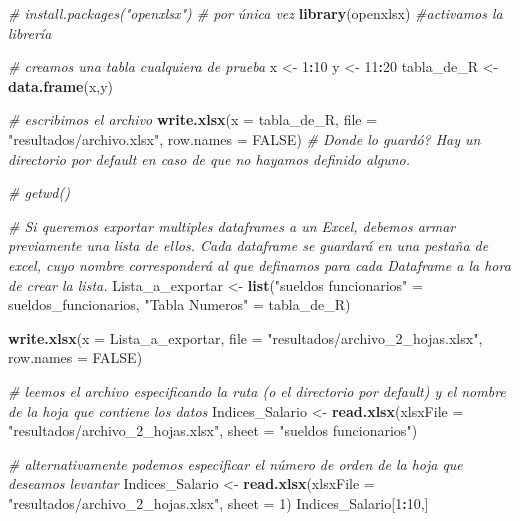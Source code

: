 \documentclass[]{book}
\newenvironment{Shaded}{\begin{snugshade}}{\end{snugshade}}
\newcommand{\CommentTok}[1]{\textcolor[rgb]{0.56,0.35,0.01}{\textit{#1}}}
\newcommand{\DataTypeTok}[1]{\textcolor[rgb]{0.13,0.29,0.53}{#1}}
\newcommand{\DecValTok}[1]{\textcolor[rgb]{0.00,0.00,0.81}{#1}}
\newcommand{\KeywordTok}[1]{\textcolor[rgb]{0.13,0.29,0.53}{\textbf{#1}}}
\newcommand{\NormalTok}[1]{#1}
\newcommand{\OperatorTok}[1]{\textcolor[rgb]{0.81,0.36,0.00}{\textbf{#1}}}
\newcommand{\OtherTok}[1]{\textcolor[rgb]{0.56,0.35,0.01}{#1}}
\newcommand{\StringTok}[1]{\textcolor[rgb]{0.31,0.60,0.02}{#1}}
\begin{document}
\begin{Shaded}
\begin{Highlighting}[]
\CommentTok{# install.packages("openxlsx") # por única vez}
\KeywordTok{library}\NormalTok{(openxlsx) }\CommentTok{#activamos la librería}

\CommentTok{# creamos una tabla cualquiera de prueba}
\NormalTok{x <-}\StringTok{ }\DecValTok{1}\OperatorTok{:}\DecValTok{10}
\NormalTok{y <-}\StringTok{ }\DecValTok{11}\OperatorTok{:}\DecValTok{20}
\NormalTok{tabla_de_R <-}\StringTok{ }\KeywordTok{data.frame}\NormalTok{(x,y)}

\CommentTok{# escribimos el archivo}
\KeywordTok{write.xlsx}\NormalTok{(}\DataTypeTok{x =}\NormalTok{ tabla_de_R, }\DataTypeTok{file =} \StringTok{"resultados/archivo.xlsx"}\NormalTok{, }\DataTypeTok{row.names =} \OtherTok{FALSE}\NormalTok{)}
\CommentTok{# Donde lo guardó? Hay un directorio por default en caso de que no hayamos definido alguno.}

\CommentTok{# getwd()}

\CommentTok{# Si queremos exportar multiples dataframes a un Excel, debemos armar previamente una lista de ellos. Cada dataframe se guardará en una pestaña de excel, cuyo nombre corresponderá al que definamos para cada Dataframe a la hora de crear la lista.}
\NormalTok{Lista_a_exportar <-}\StringTok{ }\KeywordTok{list}\NormalTok{(}\StringTok{"sueldos funcionarios"}\NormalTok{ =}\StringTok{ }\NormalTok{sueldos_funcionarios,}
                         \StringTok{"Tabla Numeros"}\NormalTok{ =}\StringTok{ }\NormalTok{tabla_de_R)}

\KeywordTok{write.xlsx}\NormalTok{(}\DataTypeTok{x =}\NormalTok{ Lista_a_exportar, }\DataTypeTok{file =} \StringTok{"resultados/archivo_2_hojas.xlsx"}\NormalTok{, }\DataTypeTok{row.names =} \OtherTok{FALSE}\NormalTok{)}

\CommentTok{# leemos el archivo especificando la ruta (o el directorio por default) y el nombre de la hoja que contiene los datos}
\NormalTok{Indices_Salario <-}\StringTok{ }\KeywordTok{read.xlsx}\NormalTok{(}\DataTypeTok{xlsxFile =} \StringTok{"resultados/archivo_2_hojas.xlsx"}\NormalTok{, }\DataTypeTok{sheet =} \StringTok{"sueldos funcionarios"}\NormalTok{)}

\CommentTok{# alternativamente podemos especificar el número de orden de la hoja que deseamos levantar}
\NormalTok{Indices_Salario <-}\StringTok{ }\KeywordTok{read.xlsx}\NormalTok{(}\DataTypeTok{xlsxFile =} \StringTok{"resultados/archivo_2_hojas.xlsx"}\NormalTok{, }\DataTypeTok{sheet =} \DecValTok{1}\NormalTok{)}
\NormalTok{Indices_Salario[}\DecValTok{1}\OperatorTok{:}\DecValTok{10}\NormalTok{,]}
\end{Highlighting}
\end{Shaded}
\end{document}
